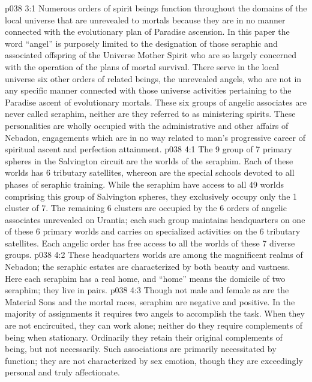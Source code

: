 \vs p038 3:1 Numerous orders of spirit beings function throughout the domains of the local universe that are unrevealed to mortals because they are in no manner connected with the evolutionary plan of Paradise ascension. In this paper the word “angel” is purposely limited to the designation of those seraphic and associated offspring of the Universe Mother Spirit who are so largely concerned with the operation of the plans of mortal survival. There serve in the local universe six other orders of related beings, the unrevealed angels, who are not in any specific manner connected with those universe activities pertaining to the Paradise ascent of evolutionary mortals. These six groups of angelic associates are never called seraphim, neither are they referred to as ministering spirits. These personalities are wholly occupied with the administrative and other affairs of Nebadon, engagements which are in no way related to man’s progressive career of spiritual ascent and perfection attainment.
\vs p038 4:1 The 9 group of 7 primary spheres in the Salvington circuit are the worlds of the seraphim. Each of these worlds has 6 tributary satellites, whereon are the special schools devoted to all phases of seraphic training. While the seraphim have access to all 49 worlds comprising this group of Salvington spheres, they exclusively occupy only the 1 cluster of 7. The remaining 6 clusters are occupied by the 6 orders of angelic associates unrevealed on Urantia; each such group maintains headquarters on one of these 6 primary worlds and carries on specialized activities on the 6 tributary satellites. Each angelic order has free access to all the worlds of these 7 diverse groups.
\vs p038 4:2 These headquarters worlds are among the magnificent realms of Nebadon; the seraphic estates are characterized by both beauty and vastness. Here each seraphim has a real home, and “home” means the domicile of two seraphim; they live in pairs.
\vs p038 4:3 \pc Though not male and female as are the Material Sons and the mortal races, seraphim are negative and positive. In the majority of assignments it requires two angels to accomplish the task. When they are not encircuited, they can work alone; neither do they require complements of being when stationary. Ordinarily they retain their original complements of being, but not necessarily. Such associations are primarily necessitated by function; they are not characterized by sex emotion, though they are exceedingly personal and truly affectionate.
